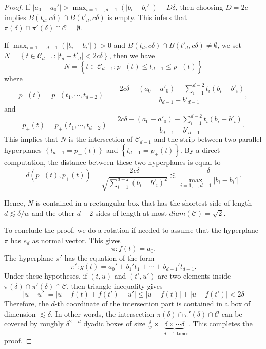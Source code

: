 \documentclass[11pt]{article}
\newcommand{\1}{\mathbf{1}}
\begin{document}
\begin{proof}
If   $|a_0-a_0'| > \max_{i=1, \ldots, d-1}\left(|b_i-b_i'|\right)+D\delta$, then choosing  $D=2c $ implies $ B(t_d,c\delta) \cap B(t'_d,c\delta)$ is empty. This infers that 
$\pi(\delta) \cap \pi'(\delta) \cap \mathcal{C}=\emptyset$.

If $\max_{i=1, \ldots, d-1}(|b_i-b_i'|)>0$ and $B(t_d,c\delta) \cap B(t'_d,c\delta)\ne \emptyset$, we set $N = \left\lbrace t \in \mathcal{C}_{d-1}: |t_d-t'_d| <2c\delta\right\rbrace$, then we have 
\[N = \left\lbrace t \in  \mathcal{C}_{d-1}: p_-(t) \le t_{d-1} \le p_+(t)\right\rbrace\]
where
\[p_-(t) = p_-(t_1,\cdots,t_{d-2}) = \dfrac{-2c\delta -(a_0-a'_0)-\sum_{i=1}^{d-2}t_i(b_i-b'_i)}{b_{d-1}-b'_{d-1}},\]
and
\[p_+(t) = p_+(t_1,\cdots,t_{d-2}) = \dfrac{2c\delta -(a_0-a'_0)-\sum_{i=1}^{d-2}t_i(b_i-b'_i)}{b_{d-1}-b'_{d-1}}.\]
This implies that $N$ is the intersection of $\mathcal{C}_{d-1}$ and the strip between two parallel hyperplanes $\left\lbrace t_{d-1}=p_-(t)\right\rbrace $ and $\left\lbrace t_{d-1}=p_+(t)\right\rbrace $. By a direct computation, the distance between these two hyperplanes is equal to \[d(p_-(t),p_+(t))=\dfrac{2c\delta}{\sqrt{\sum_{i=1}^{d-2} (b_i-b'_i)^2}} \lesssim \dfrac{\delta}{\max_{i=1, \ldots, d-1}|b_i-b_i'|}.\]

Hence, $N$ is contained in a rectangular box that has the shortest side of length $d\lesssim \delta/w$ and the other $d-2$ sides of length at most $diam(\mathcal{C})=\sqrt{2}$.


To conclude the proof, we do a rotation if needed to assume that the hyperplane $\pi$ has $e_d$ as normal vector. This gives
    \[\pi: f(t) = a_0.\]
    The hyperplane $\pi'$ has the equation of the form
    \[\pi': g(t) = a_0'+b_1't_1+\cdots +b_{d-1}'t_{d-1}.\]
Under these hypotheses, if $(t,u)$ and $(t',u')$ are two elements inside $\pi(\delta)\cap \pi'(\delta)\cap \mathcal{C}$, then triangle inequality gives
\[|u-u'| = |u-f(t)+f(t')-u'| \le |u-f(t)|+|u-f(t')| <2\delta\]
Therefore, the $d$-th coordinate of the intersection part is contained in a box of dimension $\lesssim \delta$. In other words, the intersection $\pi(\delta)\cap \pi'(\delta)\cap \mathcal{C}$ can be covered by roughly $\delta^{2-d}$ dyadic boxes of size $\frac{\delta}{w}\times\underbrace{\delta\times\cdots \delta}_\textrm{ $d-1$ times}$. This completes the proof.
\end{proof}
\end{document}
